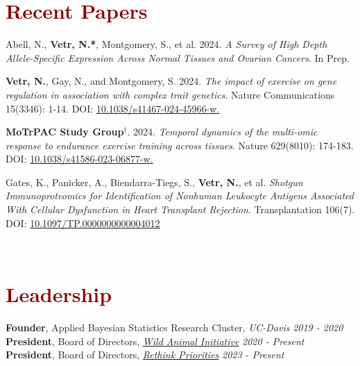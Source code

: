 \documentclass[11pt,margin,line]{resume}
\begin{document}
\begin{resume}
\begin{multicols}{3}
\begin{itemize}
    \end{itemize}
    \end{multicols}\vspace{-5mm}

\section{\large\textcolor{DarkRed}{Recent Papers}}

Abell, N., \textbf{Vetr, N.*},  Montgomery, S., et al.  2024.  \emph{A Survey of High Depth Allele-Specific Expression Across Normal Tissues and Ovarian Cancers}.  In Prep.

\textbf{Vetr, N.},  Gay,  N.,  and Montgomery,  S.  2024.  \emph{The impact of exercise on gene regulation in association with complex trait genetics}.  Nature Communications 15(3346): 1-14. DOI: \href{https://doi.org/10.1038/s41467-024-45966-w}{\color{blue}10.1038/s41467-024-45966-w.}

\textbf{MoTrPAC Study Group}$^{\dag}$. 2024.  \emph{Temporal dynamics of the multi-omic response to endurance exercise training across tissues}.  Nature 629(8010): 174-183. DOI: \href{https://doi.org/10.1038/s41586-023-06877-w}{\color{blue}10.1038/s41586-023-06877-w.}

Gates, K., Panicker, A., Biendarra-Tiegs, S., \textbf{Vetr, N.}, et al.  \emph{Shotgun Immunoproteomics for Identification of Nonhuman Leukocyte Antigens Associated With Cellular Dysfunction in Heart Transplant Rejection}. Transplantation 106(7). DOI: \href{https://pubmed.ncbi.nlm.nih.gov/34923540}{\color{blue}10.1097/TP.0000000000004012}

\vspace{-1.5mm}
\\

\vspace{-1.5mm}
\section{\large\textcolor{DarkRed}{Leadership}}
\textbf{Founder}, Applied Bayesian Statistics Research Cluster, \textit{UC-Davis} \hfill \emph{2019 - 2020}\\
\textbf{President}, Board of Directors, \textit{\href{https://www.wildanimalinitiative.org/}{Wild Animal Initiative}} \hfill \emph{2020 - Present}\\
\textbf{President}, Board of Directors, \textit{\href{https://rethinkpriorities.org/}{Rethink Priorities}} \hfill \emph{2023 - Present}\\


\end{resume}
\end{document}
